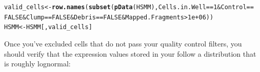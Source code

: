 \documentclass[10pt,oneside]{article}\usepackage[]{graphicx}\usepackage[]{color}
\makeatletter
\newcommand{\hlnum}[1]{\textcolor[rgb]{0.686,0.059,0.569}{#1}}%
\newcommand{\hlopt}[1]{\textcolor[rgb]{0,0,0}{#1}}%
\newcommand{\hlstd}[1]{\textcolor[rgb]{0.345,0.345,0.345}{#1}}%
\newcommand{\hlkwb}[1]{\textcolor[rgb]{0.69,0.353,0.396}{#1}}%
\newcommand{\hlkwd}[1]{\textcolor[rgb]{0.737,0.353,0.396}{\textbf{#1}}}%
\newenvironment{kframe}{%
 \def\at@end@of@kframe{}%
 \ifinner\ifhmode%
  \def\at@end@of@kframe{\end{minipage}}%
  \begin{minipage}{\columnwidth}%
 \fi\fi%
 \def\FrameCommand##1{\hskip\@totalleftmargin \hskip-\fboxsep
 \colorbox{shadecolor}{##1}\hskip-\fboxsep
     \hskip-\linewidth \hskip-\@totalleftmargin \hskip\columnwidth}%
 \MakeFramed {\advance\hsize-\width
   \@totalleftmargin\z@ \linewidth\hsize
   \@setminipage}}%
 {\par\unskip\endMakeFramed%
 \at@end@of@kframe}
\newenvironment{knitrout}{}{} %
\makeatother
\begin{document}
\begin{knitrout}
\color{fgcolor}\begin{kframe}
\begin{alltt}
\hlstd{valid_cells} \hlkwb{<-} \hlkwd{row.names}\hlstd{(}\hlkwd{subset}\hlstd{(}\hlkwd{pData}\hlstd{(HSMM), Cells.in.Well} \hlopt{==} \hlnum{1} \hlopt{&} \hlstd{Control} \hlopt{==}
    \hlnum{FALSE} \hlopt{&} \hlstd{Clump} \hlopt{==} \hlnum{FALSE} \hlopt{&} \hlstd{Debris} \hlopt{==} \hlnum{FALSE} \hlopt{&} \hlstd{Mapped.Fragments} \hlopt{>} \hlnum{1e+06}\hlstd{))}
\hlstd{HSMM} \hlkwb{<-} \hlstd{HSMM[, valid_cells]}
\end{alltt}
\end{kframe}
\end{knitrout}


Once you've excluded cells that do not pass your quality control filters, you should verify that the expression values stored in your  follow a distribution that is roughly lognormal:  
\end{document}

